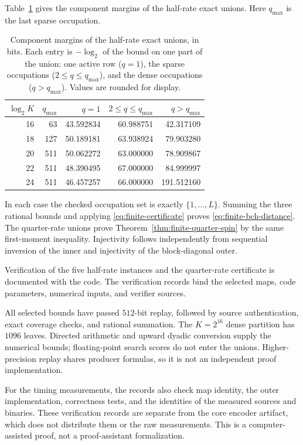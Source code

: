 Table~\ref{tab:finite-bch-components} gives the component margins of the
half-rate exact unions. Here $q_{\max}$ is the last sparse occupation.
\begin{table}[!htbp]
\centering
\caption{Component margins of the half-rate exact unions, in bits. Each
entry is $-\log_2$ of the bound on one part of the union: one active row
($q=1$), the sparse occupations ($2\le q\le q_{\max}$), and the dense
occupations ($q>q_{\max}$). Values are rounded for display.}
\label{tab:finite-bch-components}
\begin{tabular}{@{}rrrrr@{}}
\toprule
$\log_2K$ & $q_{\max}$ & $q=1$ & $2\le q\le q_{\max}$ & $q>q_{\max}$\\
\midrule
16 & 63 & 43.592834 & 60.988751 & 42.317109\\
18 & 127 & 50.189181 & 63.938924 & 79.903280\\
20 & 511 & 50.062272 & 63.000000 & 78.909867\\
22 & 511 & 48.390495 & 67.000000 & 84.999997\\
24 & 511 & 46.457257 & 66.000000 & 191.512160\\
\bottomrule
\end{tabular}
\end{table}
In each case the checked occupation set is exactly $\{1,\ldots,L\}$.
Summing the three rational bounds and applying
\eqref{eq:finite-certificate} proves \eqref{eq:finite-bch-distance}.
The quarter-rate unions prove Theorem~\ref{thm:finite-quarter-spin}
by the same first-moment inequality.
Injectivity follows independently from sequential inversion of the inner
and injectivity of the block-diagonal outer.

Verification of the five half-rate instances and the quarter-rate
certificate is documented with the code\repositorycite. The verification
records bind the selected maps, code parameters, numerical inputs, and
verifier sources.

All selected bounds have passed $512$-bit replay, followed by source
authentication, exact coverage checks, and rational summation.
The $K=2^{16}$ dense partition has $1096$ leaves.
Directed arithmetic and upward dyadic conversion supply the numerical
bounds; floating-point search scores do not enter the unions.
Higher-precision replay shares producer formulas, so it is not an
independent proof implementation.

For the timing measurements, the records also check map identity, the outer
implementation, correctness tests, and the identities of the measured
sources and binaries. These verification records are separate from the core
encoder artifact, which does not distribute them or the raw measurements.
This is a computer-assisted proof, not a proof-assistant formalization.
